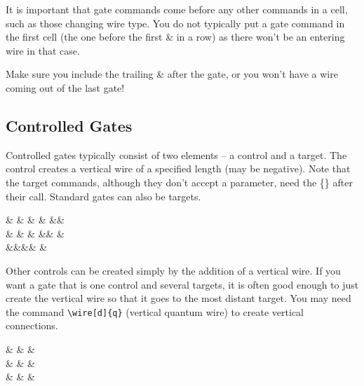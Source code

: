 \documentclass[aps,pra,10pt,nofootinbib]{revtex4-2}
\begin{document}
It is important that gate commands come before any other commands in a cell, such as those changing wire type. You do not typically put a gate command in the first cell (the one before the first \& in a row) as there won't be an entering wire in that case.

Make sure you include the trailing \& after the gate, or you won't have a wire coming out of the last gate!

\subsection{Controlled Gates}

Controlled gates typically consist of two elements -- a control and a target. The control creates a vertical wire of a specified length (may be negative). Note that the target commands, although they don't accept a parameter, need the \{\} after their call. Standard gates can also be targets.
\begin{Code}
\begin{quantikz}
&  & \targ{} &  &  &&\\
& \control{} &  & \targX{} &&  &\\
&&&&  & \meter{} 
\end{quantikz}
\end{Code}
Other controls can be created simply by the addition of a vertical wire.
If you want a gate that is one control and several targets, it is often good enough to just create the vertical wire so that it goes to the most distant target. You may need the command \verb!\wire[d]{q}! (vertical quantum wire) to create vertical connections.

\begin{Code}
\begin{quantikz}
&  &  & \\
& \targ{} &  & \\
& \targ{} &  &
\end{quantikz}
\end{Code}
\end{document}

